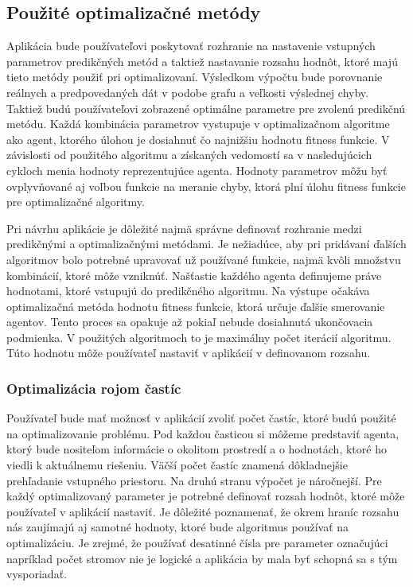 \documentclass[a4paper,slovak,12pt,appendix]{article}
\begin{document}

\subsection{Použité optimalizačné metódy}
Aplikácia bude používateľovi poskytovať rozhranie na nastavenie vstupných
parametrov predikčných metód a taktiež nastavanie rozsahu hodnôt, ktoré majú
tieto metódy použiť pri optimalizovaní. Výsledkom výpočtu bude porovnanie
reálnych a predpovedaných dát v podobe grafu a veľkosti výslednej chyby.
Taktiež budú používateľovi zobrazené optimálne parametre pre zvolenú predikčnú
metódu. Každá kombinácia parametrov vystupuje v optimalizačnom algoritme ako
agent, ktorého úlohou je dosiahnuť čo najnižšiu hodnotu fitness funkcie.
V závislosti od použitého algoritmu a získaných vedomostí sa v nasledujúcich
cykloch menia hodnoty reprezentujúce agenta. Hodnoty parametrov môžu byť
ovplyvňované aj voľbou funkcie na meranie chyby, ktorá plní úlohu fitness
funkcie pre optimalizačné algoritmy.

Pri návrhu aplikácie je dôležité najmä správne definovať rozhranie medzi
predikčnými a optimalizačnými metódami. Je nežiadúce, aby pri pridávaní
ďalších algoritmov bolo potrebné upravovať už používané funkcie, najmä kvôli
množstvu kombinácií, ktoré môže vzniknúť. Našťastie každého agenta definujeme
práve hodnotami, ktoré vstupujú do predikčného algoritmu. Na výstupe očakáva
optimalizačná metóda hodnotu fitness funkcie, ktorá určuje ďalšie smerovanie
agentov. Tento proces sa opakuje až pokiaľ nebude dosiahnutá ukončovacia
podmienka. V použitých algoritmoch to je maximálny počet iterácií algoritmu.
Túto hodnotu môže používateľ nastaviť v aplikácií v definovanom rozsahu.

\subsubsection{Optimalizácia rojom častíc}
Používateľ bude mať možnosť v aplikácií zvoliť počet častíc, ktoré budú
použité na optimalizovanie problému. Pod každou časticou si môžeme predstaviť
agenta, ktorý bude nositeľom informácie o okolitom prostredí a o hodnotách,
ktoré ho viedli k aktuálnemu riešeniu. Väčší počet častíc znamená dôkladnejšie
prehľadanie vstupného priestoru. Na druhú stranu výpočet je náročnejší.
Pre každý optimalizovaný parameter je
potrebné definovať rozsah hodnôt, ktoré môže používateľ v aplikácií nastaviť.
Je dôležité poznamenať, že okrem hraníc rozsahu nás zaujímajú aj samotné
hodnoty, ktoré bude algoritmus používať na optimalizáciu. Je zrejmé, že
používať desatinné čísla pre parameter označujúci napríklad počet stromov nie je
logické a aplikácia by mala byť schopná sa s tým vysporiadať.
\end{document}
